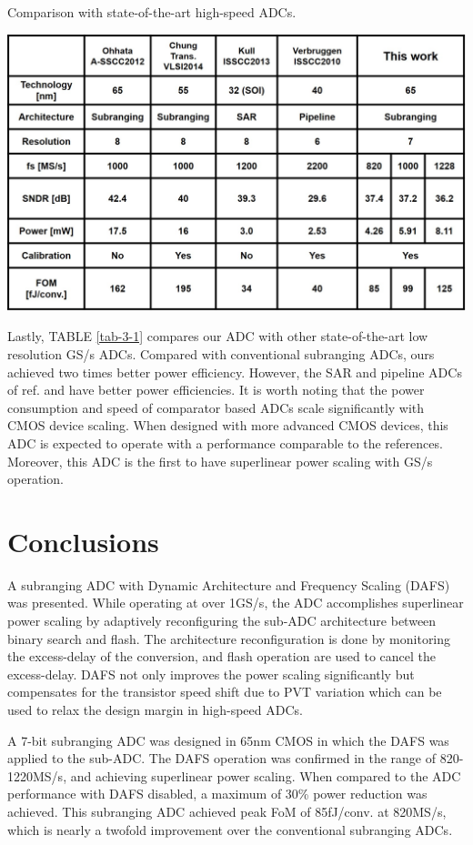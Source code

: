 \begin{table}
\centering
  \caption{Comparison with state-of-the-art high-speed ADCs.}
  \includegraphics[width=1\textwidth]{figure/chap3/table1.jpg}
  
  \label{tab-3-1}
\end{table}

 Lastly, TABLE \ref{tab-3-1} compares our ADC with other state-of-the-art low resolution GS/s ADCs. Compared with conventional subranging ADCs, ours achieved two times better power efficiency. However, the SAR and pipeline ADCs of ref.\cite{verbruggen20102} and \cite{kullsar} have better power efficiencies. It is worth noting that the power consumption and speed of comparator based ADCs scale significantly with CMOS device scaling. When designed with more advanced CMOS devices, this ADC is expected to operate with a performance comparable to the references. Moreover, this ADC is the first to have superlinear power scaling with GS/s operation.

\section{Conclusions}

A subranging ADC with Dynamic Architecture and Frequency Scaling (DAFS) was presented. While operating at over 1GS/s, the ADC accomplishes superlinear power scaling by adaptively reconfiguring the sub-ADC architecture between binary search and flash. The architecture reconfiguration is done by monitoring the excess-delay of the conversion, and flash operation are used to cancel the excess-delay. DAFS not only improves the power scaling significantly but compensates for the transistor speed shift due to PVT variation which can be used to relax the design margin in high-speed ADCs.

A 7-bit subranging ADC was designed in 65nm CMOS in which the DAFS was applied to the sub-ADC. The DAFS operation was confirmed in the range of 820-1220MS/s, and achieving superlinear power scaling. When compared to the ADC performance with DAFS disabled, a maximum of 30\% power reduction was achieved. This subranging ADC achieved peak FoM of 85fJ/conv. at 820MS/s, which is nearly a twofold improvement over the conventional subranging ADCs.
